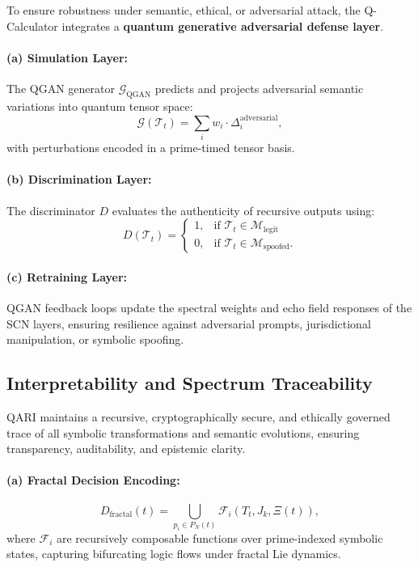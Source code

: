 \documentclass[12pt]{article}
\begin{document}
To ensure robustness under semantic, ethical, or adversarial attack, the Q-Calculator integrates a \textbf{quantum generative adversarial defense layer}.

\paragraph{(a) Simulation Layer:}
The QGAN generator \( \mathcal{G}_{\text{QGAN}} \) predicts and projects adversarial semantic variations into quantum tensor space:
\[
\mathcal{G}(\mathcal{T}_t) = \sum_i w_i \cdot \Delta_i^{\text{adversarial}},
\]
with perturbations encoded in a prime-timed tensor basis.

\paragraph{(b) Discrimination Layer:}
The discriminator \( D \) evaluates the authenticity of recursive outputs using:
\[
D(\mathcal{T}_t) = 
\begin{cases}
1, & \text{if } \mathcal{T}_t \in \mathcal{M}_{\text{legit}} \\
0, & \text{if } \mathcal{T}_t \in \mathcal{M}_{\text{spoofed}}.
\end{cases}
\]

\paragraph{(c) Retraining Layer:}
QGAN feedback loops update the spectral weights and echo field responses of the SCN layers, ensuring resilience against adversarial prompts, jurisdictional manipulation, or symbolic spoofing.

\subsection{Interpretability and Spectrum Traceability}

QARI maintains a recursive, cryptographically secure, and ethically governed trace of all symbolic transformations and semantic evolutions, ensuring transparency, auditability, and epistemic clarity.

\paragraph{(a) Fractal Decision Encoding:}
\[
D_{\text{fractal}}(t) = \bigcup_{p_i \in P_N(t)} \mathcal{F}_i(T_t, J_k, \Xi(t)),
\]
where \( \mathcal{F}_i \) are recursively composable functions over prime-indexed symbolic states, capturing bifurcating logic flows under fractal Lie dynamics.
\end{document}
